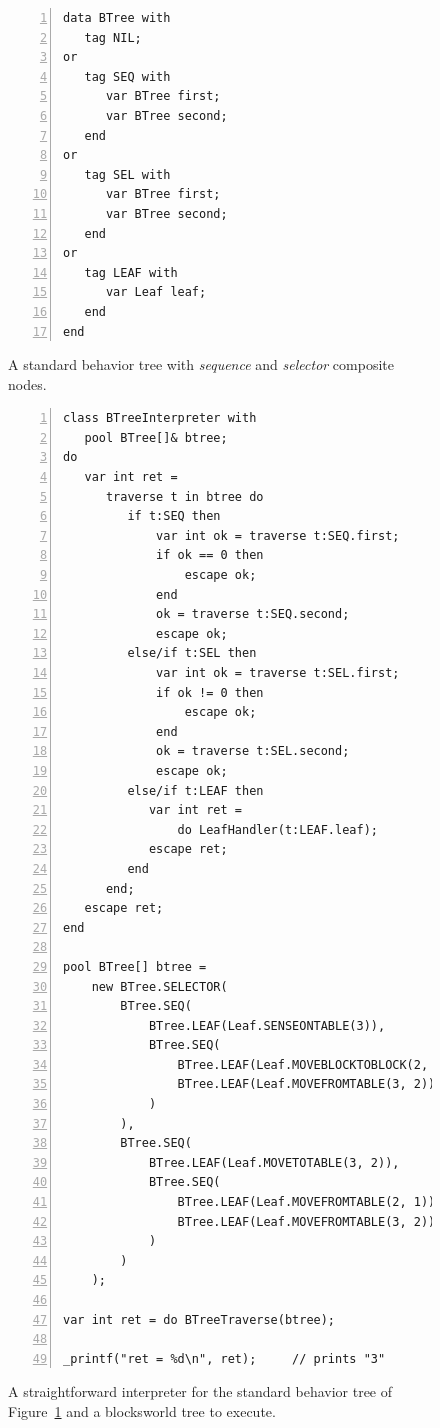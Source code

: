 \documentclass{acm_proc_article-sp}
\begin{document}
\begin{figure}%
\begin{lstlisting}[numbers=left,xleftmargin=3em]
data BTree with
   tag NIL;
or
   tag SEQ with
      var BTree first;
      var BTree second;
   end
or
   tag SEL with
      var BTree first;
      var BTree second;
   end
or
   tag LEAF with
      var Leaf leaf;
   end
end

\end{lstlisting}
\caption{ A standard behavior tree with \emph{sequence} and \emph{selector}
          composite nodes.
\label{lst.bt1}
}
\end{figure}

\begin{figure}%
\begin{lstlisting}[numbers=left,xleftmargin=3em]
class BTreeInterpreter with
   pool BTree[]& btree;
do
   var int ret =
      traverse t in btree do
         if t:SEQ then
             var int ok = traverse t:SEQ.first;
             if ok == 0 then
                 escape ok;
             end
             ok = traverse t:SEQ.second;
             escape ok;
         else/if t:SEL then
             var int ok = traverse t:SEL.first;
             if ok != 0 then
                 escape ok;
             end
             ok = traverse t:SEL.second;
             escape ok;
         else/if t:LEAF then
            var int ret =
                do LeafHandler(t:LEAF.leaf);
            escape ret;
         end
      end;
   escape ret;
end

pool BTree[] btree =
    new BTree.SELECTOR(
        BTree.SEQ(
            BTree.LEAF(Leaf.SENSEONTABLE(3)),
            BTree.SEQ(
                BTree.LEAF(Leaf.MOVEBLOCKTOBLOCK(2, 3, 1)),
                BTree.LEAF(Leaf.MOVEFROMTABLE(3, 2))
            )
        ),
        BTree.SEQ(
            BTree.LEAF(Leaf.MOVETOTABLE(3, 2)),
            BTree.SEQ(
                BTree.LEAF(Leaf.MOVEFROMTABLE(2, 1)),
                BTree.LEAF(Leaf.MOVEFROMTABLE(3, 2))
            )
        )
    );

var int ret = do BTreeTraverse(btree);

_printf("ret = %d\n", ret);     // prints "3"
\end{lstlisting}
\caption{ A straightforward interpreter for the standard behavior tree of 
          Figure~\ref{lst.bt1} and a blocksworld tree to execute.
\label{lst.bt1.interpreter}
}
\end{figure}
\end{document}

